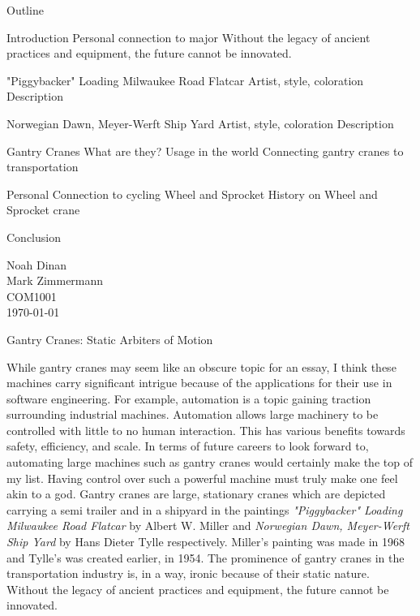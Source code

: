 \documentclass[12pt]{article}
\begin{document}
\begin{center}
Outline
\end{center}

\begin{outline}[enumerate]
\1 Introduction
    \2 Personal connection to major
    \2 Without the legacy of ancient practices and equipment, the future cannot be innovated.

\1 "Piggybacker" Loading Milwaukee Road Flatcar
    \2 Artist, style, coloration
    \2 Description

\1 Norwegian Dawn, Meyer-Werft Ship Yard
    \2 Artist, style, coloration
    \2 Description

\1 Gantry Cranes
    \2 What are they?
    \2 Usage in the world
    \2 Connecting gantry cranes to transportation

\1 Personal Connection to cycling
    \2 Wheel and Sprocket
    \2 History on Wheel and Sprocket crane

\1 Conclusion

\end{outline}

\newpage

\noindent
Noah Dinan \\ Mark Zimmermann \\ COM1001 \\ \today \\

\begin{center}
Gantry Cranes: Static Arbiters of Motion
\end{center}

\setlength{\parindent}{0.5in}

While gantry cranes may seem like an obscure topic for an essay, I think these machines carry significant intrigue because of the applications for
their use in software engineering. For example, automation is a topic gaining traction surrounding industrial machines.
Automation allows large machinery to be controlled with little to no 
human interaction. This has various benefits towards safety, efficiency, and scale. In terms of future careers to look forward to, automating large machines such
as gantry cranes would certainly make the top of my list. Having control over such a powerful machine must truly make one feel akin to a god.
Gantry cranes are large, stationary cranes which are depicted carrying a semi trailer and in a shipyard
in the paintings \textit{"Piggybacker" Loading Milwaukee Road Flatcar} by Albert W. Miller and \textit{Norwegian Dawn, Meyer-Werft Ship Yard} by 
Hans Dieter Tylle respectively. Miller's painting was made in 1968 and Tylle's was created earlier, in 1954.
The prominence of gantry cranes in the transportation industry is, in a way, ironic because of their static nature.
Without the legacy of ancient practices and equipment, the future cannot be innovated.
\end{document}

